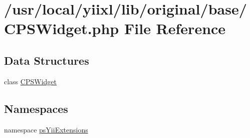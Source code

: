 \hypertarget{CPSWidget_8php}{
\section{/usr/local/yiixl/lib/original/base/CPSWidget.php File Reference}
\label{CPSWidget_8php}
}
\subsection*{Data Structures}
\begin{DoxyCompactItemize}
\item 
class \hyperlink{classCPSWidget}{CPSWidget}
\end{DoxyCompactItemize}
\subsection*{Namespaces}
\begin{DoxyCompactItemize}
\item 
namespace \hyperlink{namespacepsYiiExtensions}{psYiiExtensions}
\end{DoxyCompactItemize}
